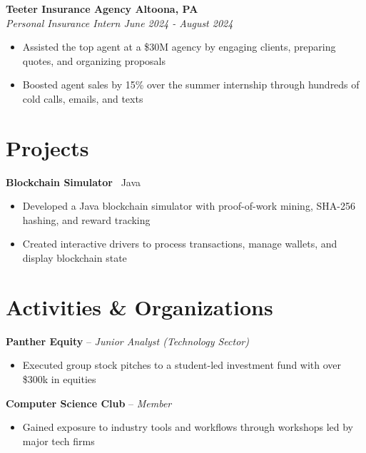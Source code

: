\documentclass[11pt]{article}
\begin{document}
\vspace{0.1em}

\begin{adjustwidth}{0.5em}{0em}
\textbf{Teeter Insurance Agency \hfill Altoona, PA} \\
\textit{Personal Insurance Intern \hfill June 2024 - August 2024} 
\begin{itemize}[leftmargin=1.5em, itemsep=0em, topsep=0.2em]
    \item Assisted the top agent at a \$30M agency by engaging clients, preparing quotes, and organizing proposals
    \item Boosted agent sales by 15\% over the summer internship through hundreds of cold calls, emails, and texts  
\end{itemize} 
\end{adjustwidth}


\section*{Projects}
\begin{adjustwidth}{0.5em}{0em}

\textbf{Blockchain Simulator} \textbar\ Java
\begin{itemize}[leftmargin=2em, itemsep=0pt, topsep=1.5pt]
    \item Developed a Java blockchain simulator with proof-of-work mining, SHA-256 hashing, and reward tracking
    \item Created interactive drivers to process transactions, manage wallets, and display blockchain state
\end{itemize} 
\end{adjustwidth}

\section*{Activities \& Organizations}
\begin{adjustwidth}{0.5em}{0em}
\textbf{Panther Equity} -- \textit{Junior Analyst (Technology Sector)} 
\begin{itemize}[leftmargin=1.5em, itemsep=0em, topsep=0.2em]
    \item Executed group stock pitches to a student-led investment fund with over \$300k in equities
\end{itemize}
\end{adjustwidth}

\vspace{0.1em}
\begin{adjustwidth}{0.5em}{0em}
\textbf{Computer Science Club} -- \textit{Member}
\begin{itemize}[leftmargin=1.5em, itemsep=0em, topsep=0.2em]
    \item Gained exposure to industry tools and workflows through workshops led by major tech firms
\end{itemize}
\end{adjustwidth}
\end{document}
